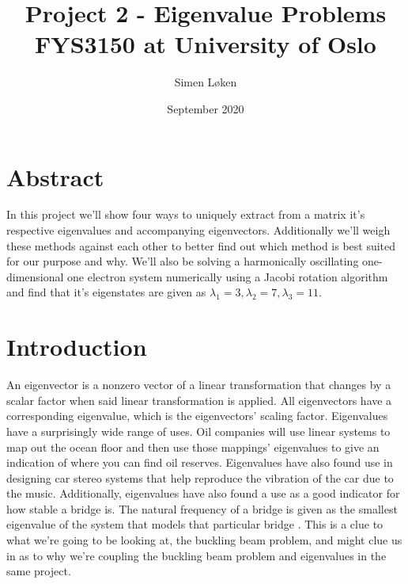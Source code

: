 \documentclass{article}
\title{%
Project 2 - Eigenvalue Problems \\
\large FYS3150 at University of Oslo}
\author{Simen Løken}
\date{September 2020}
\begin{document}
\nocite{lec}
\maketitle
\section{Abstract}
In this project we'll show four ways to uniquely extract from a matrix it's respective eigenvalues and accompanying eigenvectors. Additionally we'll weigh these methods against each other to better find out which method is best suited for our purpose and why. \newline
We'll also be solving a harmonically oscillating one-dimensional one electron system numerically using a Jacobi rotation algorithm and find that it's eigenstates are given as $\lambda_1 = 3, \lambda_2 = 7, \lambda_3 = 11$.
\section{Introduction}
An eigenvector is a nonzero vector of a linear transformation that changes by a scalar factor when said linear transformation is applied. All eigenvectors have a corresponding eigenvalue, which is the eigenvectors' scaling factor.\newline 
Eigenvalues have a surprisingly wide range of uses. Oil companies will use linear systems to map out the ocean floor and then use those mappings' eigenvalues to give an indication of where you can find oil reserves. Eigenvalues have also found use in designing car stereo systems that help reproduce the vibration of the car due to the music. Additionally, eigenvalues have also found a use as a good indicator for how stable a bridge is. The natural frequency of a bridge is given as the smallest eigenvalue of the system that models that particular bridge \cite{artic}. This is a clue to what we're going to be looking at, the buckling beam problem, and might clue us in as to why we're coupling the buckling beam problem and eigenvalues in the same project.
\end{document}
